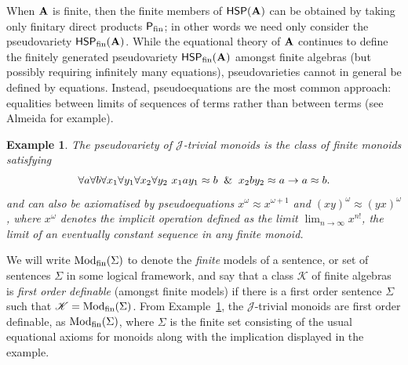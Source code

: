 \documentclass[10pt,a4paper]{amsart}
\theoremstyle{plain}
\newtheorem{example}[thm]{Example}
\theoremstyle{definition}
\newcommand{\Mod}{\operatorname{Mod}}
\begin{document}
  When ${\bf A}$ is finite, then the finite members of $\mathsf{HSP}({\bf A})$ can be obtained by taking only finitary direct products $\mathsf{P}_{\rm fin}$; in other words we need only consider the pseudovariety $\mathsf{HSP}_{\rm fin}({\bf A})$. 
While the equational theory of ${\bf A}$ continues to define the finitely generated pseudovariety $\mathsf{HSP}_{\rm fin}({\bf A})$ amongst finite algebras (but possibly requiring infinitely many equations), pseudovarieties cannot in general be defined by equations.  
Instead, pseudoequations are the most common approach: equalities between limits of sequences of terms rather than between terms (see Almeida \cite{alm} for example).
  \begin{example}\label{eg:Jtrivial}
  The pseudovariety of $\mathscr{J}$-trivial monoids is the class of finite monoids satisfying 
  \[
\forall a\forall b\forall x_1\forall y_1\forall x_2\forall y_2\ x_1ay_1\approx b\And x_2by_2\approx a\rightarrow a\approx b.
\]
and can also be axiomatised by pseudoequations $x^\omega\approx x^{\omega+1}$ and $(xy)^\omega\approx (yx)^\omega$, where $x^\omega$ denotes the implicit operation defined as the limit $\lim_{n\to\infty}x^{n!}$, the limit of an eventually constant sequence in any finite monoid.
  \end{example}
We will write $\Mod_{\rm fin}(\Sigma)$ to denote the \emph{finite} models of a sentence, or set of sentences $\Sigma$ in some logical framework, and say that a class $\mathscr{K}$ of finite algebras is \emph{first order definable} (amongst finite models) if there is a first order sentence $\Sigma$ such that $\mathscr{K}=\Mod_{\rm fin}(\Sigma)$.
From Example~\ref{eg:Jtrivial}, the $\mathscr{J}$-trivial monoids are first order definable, as $\Mod_{\rm fin}(\Sigma)$, where $\Sigma$ is the finite set consisting of the usual equational axioms for monoids along with the implication displayed in the example.
\end{document}

